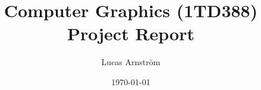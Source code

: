 \documentclass[a4paper]{article}
\title{Computer Graphics (1TD388)\\Project Report}
\author{Lucas Arnström}
\date{\today}
\begin{document}
\maketitle
\begin{multicols*}{2}

\end{multicols*}
\printbibliography
\end{document}
